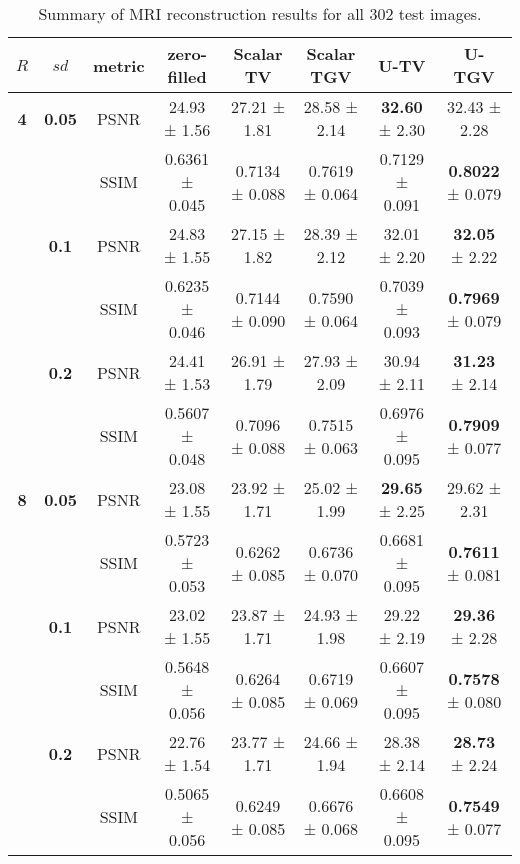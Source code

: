 \begin{table}[!t]
  \centering
  \scriptsize
   {\renewcommand{\arraystretch}{1.1}
  \begin{tabular}{c|c|c|c|c|c|c|c}
      $R$ &$sd$ & metric   &  \textbf{zero-filled} & \textbf{Scalar TV} & \textbf{Scalar TGV} & \textbf{U-TV} & \textbf{U-TGV}\\ \hline

      \textbf{4} & \textbf{0.05} & PSNR & 24.93 ± 1.56 & 27.21 ± 1.81 & 28.58 ± 2.14 & \textbf{32.60} ± 2.30 & 32.43 ± 2.28 \\

      \textbf{ } & \textbf{}     & SSIM & 0.6361 ± 0.045 & 0.7134 ± 0.088 & 0.7619 ± 0.064 & 0.7129 ± 0.091 &  \textbf{0.8022} ± 0.079 \\ \hline

      \textbf{ } & \textbf{0.1}  & PSNR & 24.83 ± 1.55 & 27.15 ± 1.82 & 28.39 ± 2.12 & 32.01 ± 2.20 &  \textbf{32.05} ± 2.22 \\

      \textbf{ } & \textbf{}    & SSIM &  0.6235 ± 0.046  & 0.7144 ± 0.090 & 0.7590 ± 0.064 &  0.7039 ± 0.093 &  \textbf{0.7969} ± 0.079 \\ \hline

      \textbf{ } & \textbf{0.2}  & PSNR & 24.41 ± 1.53 & 26.91 ± 1.79 & 27.93 ± 2.09 & 30.94 ± 2.11 &  \textbf{31.23} ± 2.14  \\

      \textbf{ } & \textbf{} &SSIM  & 0.5607 ± 0.048 & 0.7096 ± 0.088 & 0.7515 ± 0.063 & 0.6976 ± 0.095 &  \textbf{0.7909} ± 0.077 \\ \hline

      \textbf{8} & \textbf{0.05} &PSNR & 23.08 ± 1.55 & 23.92 ± 1.71 & 25.02 ± 1.99 & \textbf{29.65} ± 2.25 & 29.62 ± 2.31 \\

      \textbf{ } & \textbf{} &SSIM & 0.5723 ± 0.053 & 0.6262 ± 0.085 & 0.6736 ± 0.070 &  0.6681 ± 0.095  &  \textbf{0.7611} ± 0.081 \\ \hline

      \textbf{ } & \textbf{0.1} & PSNR &23.02 ± 1.55 & 23.87 ± 1.71 & 24.93 ± 1.98 &  29.22 ± 2.19 & \textbf{29.36} ± 2.28 \\

      \textbf{ } & \textbf{} & SSIM &0.5648 ± 0.056& 0.6264 ± 0.085 & 0.6719 ± 0.069 & 0.6607 ± 0.095  & \textbf{0.7578} ± 0.080 \\ \hline

      \textbf{ } & \textbf{0.2} & PSNR &22.76 ± 1.54 & 23.77 ± 1.71 & 24.66 ± 1.94 & 28.38 ± 2.14 &  \textbf{28.73} ± 2.24 \\

      \textbf{ } & \textbf{} & SSIM &0.5065 ± 0.056  & 0.6249 ± 0.085 & 0.6676 ± 0.068 & 0.6608 ± 0.095 &  \textbf{0.7549} ± 0.077 \\
  \end{tabular}
  }
  \vspace{0.5em}
  \caption{Summary of MRI reconstruction results for all 302 test images.
  }
    \label{tab:summary_MRI_tests}
\end{table}

